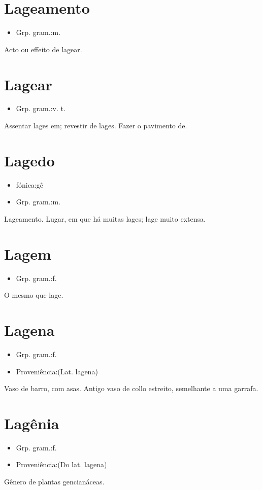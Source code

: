 \section{Lageamento}
\begin{itemize}
\item {Grp. gram.:m.}
\end{itemize}
Acto ou effeito de lagear.
\section{Lagear}
\begin{itemize}
\item {Grp. gram.:v. t.}
\end{itemize}
Assentar lages em; revestir de lages.
Fazer o pavimento de.
\section{Lagedo}
\begin{itemize}
\item {fónica:gê}
\end{itemize}
\begin{itemize}
\item {Grp. gram.:m.}
\end{itemize}
Lageamento.
Lugar, em que há muitas lages; lage muito extensa.
\section{Lagem}
\begin{itemize}
\item {Grp. gram.:f.}
\end{itemize}
O mesmo que \textunderscore lage\textunderscore .
\section{Lagena}
\begin{itemize}
\item {Grp. gram.:f.}
\end{itemize}
\begin{itemize}
\item {Proveniência:(Lat. \textunderscore lagena\textunderscore )}
\end{itemize}
Vaso de barro, com asas.
Antigo vaso de collo estreito, semelhante a uma garrafa.
\section{Lagênia}
\begin{itemize}
\item {Grp. gram.:f.}
\end{itemize}
\begin{itemize}
\item {Proveniência:(Do lat. \textunderscore lagena\textunderscore )}
\end{itemize}
Gênero de plantas gencianáceas.
